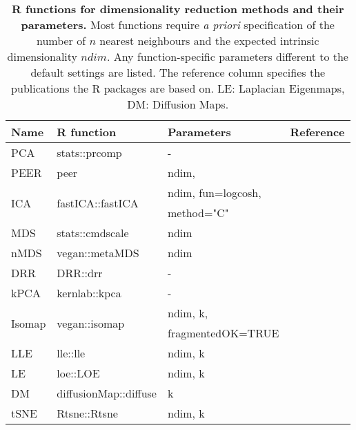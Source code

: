 \begin{table}[htbp]
  \centering
  \caption[\textbf{R functions for dimensionality reduction methods and their parameters.}]{\textbf{R functions for dimensionality reduction methods and their parameters.} Most functions require \textit{a priori} specification of the number of \(n\) nearest neighbours and the expected intrinsic dimensionality \(ndim\). Any function-specific parameters different to the default settings are listed. The reference column specifies the publications the R packages are based on. LE: Laplacian Eigenmaps, DM: Diffusion Maps.}
  \begin{small}
    \begin{tabular}{lllr}
    \toprule
    Name  & R function & Parameters & Reference \\
    \midrule
    PCA   & stats::prcomp &  -    & \citep{Hotelling1933} \\
    PEER  & peer  & ndim,  & \citep{Stegle2010} \\
    \multirow{2}[0]{*}{ICA} & \multirow{2}[0]{*}{fastICA::fastICA} & ndim, fun=logcosh, & \multirow{2}[0]{*}{\citep{Hyvarinen2000}} \\
          &       &  method="C" &  \\
    MDS   & stats::cmdscale & ndim  & \citep{Gower1966} \\
    nMDS  & vegan::metaMDS & ndim  & \citep{Ripley1996} \\
    DRR   & DRR::drr &  -    & \citep{Laparra2015} \\
    kPCA  & kernlab::kpca &  -    & \citep{Schoelkopf1998} \\
    \multirow{2}[0]{*}{Isomap} & \multirow{2}[0]{*}{vegan::isomap} & ndim, k, & \multirow{2}[0]{*}{\citep{Tenenbaum2000}} \\
          &       & fragmentedOK=TRUE &  \\
    LLE   & lle::lle & ndim, k & \citep{deRidder2002} \\
    LE & loe::LOE & ndim, k & \citep{Belkin2003} \\
    DM & diffusionMap::diffuse & k     & \citep{Lafon2006} \\
    tSNE  & Rtsne::Rtsne & ndim, k & \citep{Maaten2008} \\
    \bottomrule
    \end{tabular}%
 \end{small}
 \label{tab:dimRed-R}%
\end{table}%
%
